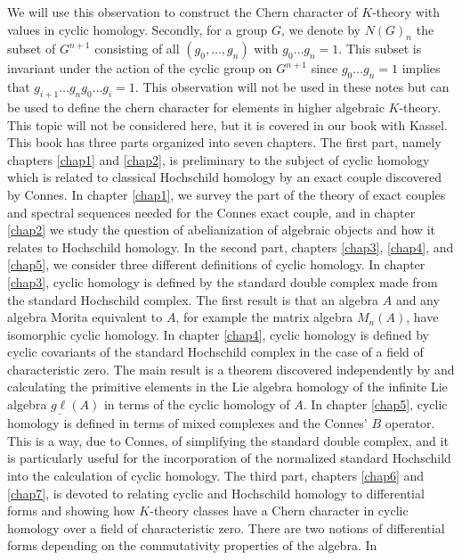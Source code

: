 We will use this observation to construct the Chern character of
$K$-theory with values in cyclic homology. Secondly, for a group $G$,
we denote by $N(G)_{n}$ the subset of $G^{n+1}$ consisting of all
$(g_{0},\ldots,g_{n})$ with $g_{0}\ldots g_{n}=1$. This subset is
invariant under the action of the cyclic group on $G^{n+1}$ since
$g_{0}\ldots g_{n}=1$ implies that $g_{i+1}\ldots g_{n}g_{0}\ldots
g_{i}=1$. This observation will not be used in these notes but can be
used to define the chern character for elements in higher algebraic
$K$-theory. This topic will not be considered here, but it is covered
in our book with Kassel. This book has three parts organized into
seven chapters. The first part, namely chapters \ref{chap1} and
\ref{chap2}, is preliminary to the subject of cyclic homology which is
related to classical Hochschild homology by an exact couple discovered
by Connes. In chapter \ref{chap1}, we survey the part of the theory of
exact couples and spectral sequences needed for the Connes exact
couple, and in chapter \ref{chap2} we study the question of
abelianization of algebraic objects and how it relates to Hochschild
homology. In the second part, chapters \ref{chap3}, \ref{chap4}, and
\ref{chap5}, we consider three different definitions of cyclic
homology. In chapter \ref{chap3}, cyclic homology is defined by the
standard double complex made from the standard Hochschild complex. The
first result is that an algebra $A$ and any algebra Morita equivalent
to $A$, for example the matrix algebra $M_{n}(A)$, have isomorphic
cyclic homology. In chapter \ref{chap4}, cyclic homology is defined by
cyclic covariants of the standard Hochschild complex in the case of a
field of characteristic zero. The main result is a theorem discovered
independently by \cite{Tsygan1983} and \cite{Loday1984} calculating
the primitive elements in the Lie algebra homology of the infinite Lie
algebra $\underline{g\ell}(A)$ in terms of the cyclic homology of
$A$. In chapter \ref{chap5}, cyclic homology is defined in terms of
mixed complexes and the Connes' $B$ operator. This is a way, due to
Connes, of simplifying the standard double complex, and it is
particularly useful for the incorporation of the normalized standard
Hochschild into the calculation of cyclic homology. The third part,
chapters \ref{chap6} and \ref{chap7}, is devoted to relating cyclic
and Hochschild homology to differential forms and showing how
$K$-theory classes have a Chern character in cyclic homology over a
field of characteristic zero. There are
 two notions of differential
forms depending on the commutativity properties of the algebra. In
